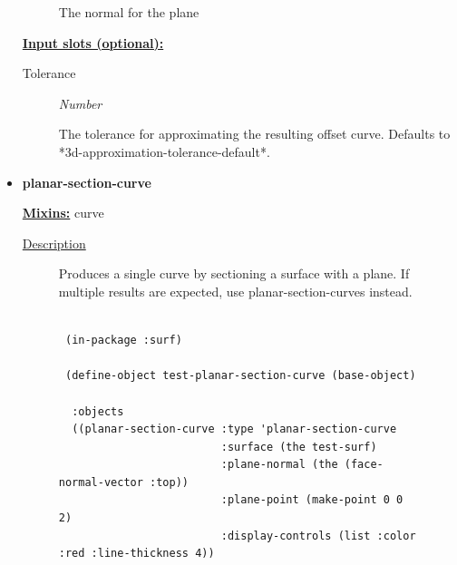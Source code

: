 \documentclass [11pt]{book}
\begin{document}
\begin{itemize}
\begin{description}
 The normal for the plane




\end{description}






\textbf{
\underline{Input slots (optional):}}

\begin{description}

\item [Tolerance]
\emph{Number}

 The tolerance for approximating the resulting offset curve.
Defaults to *3d-approximation-tolerance-default*.




\end{description}







\item {}
\label{prim:planar-section-curve}
\textbf{planar-section-curve}


\textbf{
\underline{Mixins:}} curve





\begin{description}

\item [
\underline{Description}]


Produces a single curve by sectioning a surface with a plane. If multiple results are expected,
use planar-section-curves instead.



\end{description}




\begin{figure}
\begin{lrbox}{\boxedverb}
\begin{minipage}{\linewidth}
{\small

\begin{verbatim}

 (in-package :surf)

 (define-object test-planar-section-curve (base-object)
  
  :objects
  ((planar-section-curve :type 'planar-section-curve
                         :surface (the test-surf)
                         :plane-normal (the (face-normal-vector :top))
                         :plane-point (make-point 0 0 2)
                         :display-controls (list :color :red :line-thickness 4))
   

\end{verbatim}}
\end{minipage}
\end{lrbox}
\end{figure}
\end{itemize}
\end{document}
